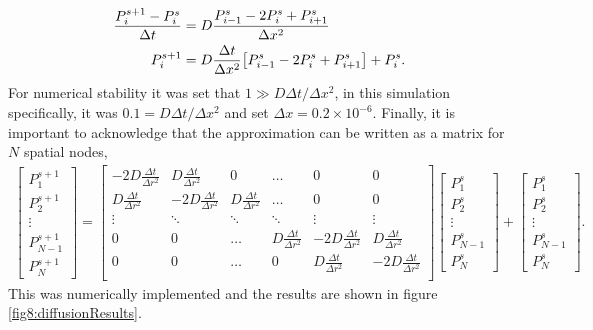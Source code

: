 \documentclass[main.tex]{subfiles}
\begin{document}
\begin{align*}
    \frac{P_{i}^{s+1} - P_i^s}{\Delta t} &= D\frac{P_{i-1}^s -2 P_i^s + P_{i+1}^s}{\Delta x^2} \\
    P_{i}^{s+1} &= D\frac{\Delta t}{\Delta x^2}\qty[P_{i-1}^s -2 P_i^s + P_{i+1}^s] + P_i^s.
\end{align*}
For numerical stability it was set that $1\gg D\Delta t/\Delta x^2$, in this simulation specifically, it was $0.1=D\Delta t/\Delta x^2$ and set $\Delta x = 0.2\times10^{-6}$.
Finally, it is important to acknowledge that the approximation can be written as a matrix for $N$ spatial nodes,
\begin{gather*}
    \begin{bmatrix}
        P_{1}^{s+1} \\
        P_{2}^{s+1} \\
        \vdots \\
        P_{N-1}^{s+1} \\
        P_{N}^{s+1}
    \end{bmatrix}
     = 
     \begin{bmatrix}
         -2 D\frac{\Delta t}{\Delta r^2} & D\frac{\Delta t}{\Delta r^2} & 0 & \dots & 0 & 0 \\
         D\frac{\Delta t}{\Delta r^2} &-2 D\frac{\Delta t}{\Delta r^2} & D\frac{\Delta t}{\Delta r^2} & \dots & 0 & 0 \\
        \vdots & \ddots & \ddots & \ddots & \vdots & \vdots \\
         0 & 0 & \dots & D\frac{\Delta t}{\Delta r^2} &-2 D\frac{\Delta t}{\Delta r^2} & D\frac{\Delta t}{\Delta r^2} \\
         0 & 0 & \dots & 0 & D\frac{\Delta t}{\Delta r^2} &-2 D\frac{\Delta t}{\Delta r^2}  \\
     \end{bmatrix}
     \begin{bmatrix}
        P_{1}^{s} \\
        P_{2}^{s} \\
        \vdots \\
        P_{N-1}^{s} \\
        P_{N}^{s}
    \end{bmatrix}
    +
    \begin{bmatrix}
        P_{1}^{s} \\
        P_{2}^{s} \\
        \vdots \\
        P_{N-1}^{s} \\
        P_{N}^{s}
    \end{bmatrix}.
\end{gather*}
This was numerically implemented and the results are shown in figure \ref{fig8:diffusionResults}.
\end{document}
